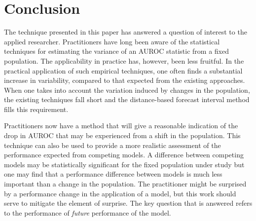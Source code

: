 

\section{Conclusion}



%
%


The technique presented in this paper has answered a question of interest to the applied researcher.
Practitioners have long been aware of the statistical techniques for estimating the variance of an AUROC statistic from a fixed population.
The applicability in practice has, however, been less fruitful.
In the practical application of such empirical techniques, one often finds a substantial increase in variability, compared to that expected from the existing approaches.
When one takes into account the variation induced by changes in the population, the existing techniques fall short and the distance-based forecast interval method 
fills this requirement. 

Practitioners now have a method that will give a reasonable indication of the drop in AUROC that may be experienced from a shift in the population.
This technique can also be used to provide a more realistic assessment of the performance expected from competing models.
A difference between competing models may be statistically significant for the fixed population under study but one may find that a performance difference between models is much less important than a change in the population.
The practitioner might be surprised by a performance change in the application of a model, but this work should serve to mitigate the element of surprise.
The key question that is answered refers to the performance of \emph{future} performance of the model.



